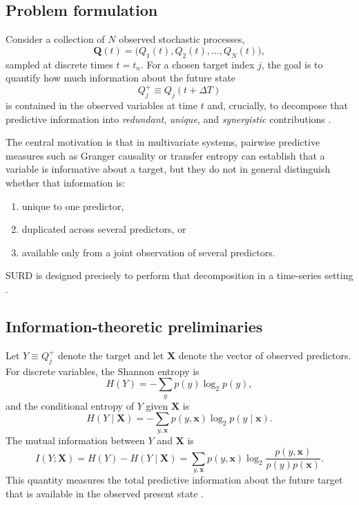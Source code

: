 \documentclass[12pt, a4paper]{article}
\begin{document}
\subsection{Problem formulation}

Consider a collection of \(N\) observed stochastic processes,
\begin{equation}
\mathbf{Q}(t)=\bigl(Q_1(t),Q_2(t),\ldots,Q_N(t)\bigr),
\end{equation}
sampled at discrete times \(t=t_n\). For a chosen target index \(j\), the goal is to quantify how much information about the future state
\begin{equation}
Q_j^+ \equiv Q_j(t+\Delta T)
\end{equation}
is contained in the observed variables at time \(t\) and, crucially, to decompose that predictive information into \emph{redundant}, \emph{unique}, and \emph{synergistic} contributions \cite{MartinezSanchez2024SURD}.

The central motivation is that in multivariate systems, pairwise predictive measures such as Granger causality or transfer entropy can establish that a variable is informative about a target, but they do not in general distinguish whether that information is:
\begin{enumerate}
    \item unique to one predictor,
    \item duplicated across several predictors, or
    \item available only from a joint observation of several predictors.
\end{enumerate}
SURD is designed precisely to perform that decomposition in a time-series setting \cite{MartinezSanchez2024SURD,Schreiber2000,WilliamsBeer2010}.

\subsection{Information-theoretic preliminaries}

Let \(Y\equiv Q_j^+\) denote the target and let \(\mathbf{X}\) denote the vector of observed predictors. For discrete variables, the Shannon entropy is
\begin{equation}
H(Y)=-\sum_{y} p(y)\log_2 p(y),
\end{equation}
and the conditional entropy of \(Y\) given \(\mathbf{X}\) is
\begin{equation}
H(Y\mid \mathbf{X})=-\sum_{y,\mathbf{x}} p(y,\mathbf{x})\log_2 p(y\mid \mathbf{x}).
\end{equation}
The mutual information between \(Y\) and \(\mathbf{X}\) is
\begin{equation}
I(Y;\mathbf{X})=H(Y)-H(Y\mid \mathbf{X})
=\sum_{y,\mathbf{x}} p(y,\mathbf{x})
\log_2\frac{p(y,\mathbf{x})}{p(y)p(\mathbf{x})}.
\label{eq:mi_total}
\end{equation}
This quantity measures the total predictive information about the future target that is available in the observed present state \cite{Shannon1948,CoverThomas2006}.
\end{document}
